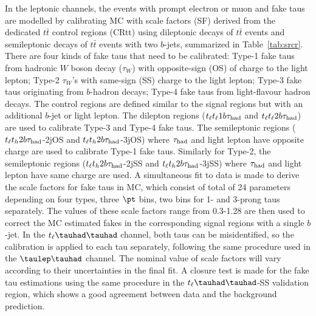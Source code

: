 In the leptonic channels, the events with prompt electron or muon and fake taus are modelled by calibrating MC with scale factors (SF)
derived from the dedicated $t\bar t$
control regions (CRtt) using dileptonic decays of $t\bar t$ events and semileptonic decays of $t\bar t$ events with two
$b$-jets, summarized in Table~\ref{tab:srcr}. 	
There are four kinds of fake taus that need to be calibrated: Type-1 fake taus from hadronic $W$ boson decay ($\tau_{W}$) %
with opposite-sign (OS) of charge to the light lepton;
Type-2 $\tau_{W}$'s with same-sign (SS) charge to the light lepton; Type-3 fake taus originating from $b$-hadron decays; Type-4 fake taus from light-flavour hadron decays.
The control regions are defined similar to the signal regions but with an additional $b$-jet or light lepton.
The dilepton regions ($t_{\ell}t_{\ell}1b\tau_\text{had}$ and $t_{\ell}t_{\ell}2b\tau_\text{had}$) are used to calibrate Type-3 and Type-4 fake taus. The semileptonic
regions ($t_{\ell}t_h2b\tau_\text{had}$-2jOS and $t_{\ell}t_h2b\tau_\text{had}$-3jOS) where $\tau_\text{had}$ and light lepton have opposite charge are used to calibrate Type-1 fake taus.
Similarly for Type-2, the semileptonic regions ($t_{\ell}t_h2b\tau_\text{had}$-2jSS and $t_{\ell}t_h2b\tau_\text{had}$-3jSS) where $\tau_\text{had}$ and light lepton have same charge are used.
A simultaneous fit to data is made to derive the scale factors for fake taus in MC, which consist of total of 24 parameters
depending on four types, three $\pt$ bins, two bins for 1- and 3-prong taus separately.
The values of these scale factors range from 0.3-1.28 are then used to correct the MC estimated fakes in the corresponding  signal regions with a single $b$-jet.
In the $t_{\ell}\thadhad$ channel, both taus can be misidentified, so the calibration is applied to each tau separately, following the same procedure used in the $\tlhad$ channel.
The nominal value of scale factors will vary according to their uncertainties in the final fit. A closure test is made for the fake tau estimations using the same procedure
in the $t_{\ell}\thadhad$-SS validation region, which shows a good agreement between data and the background prediction. 

